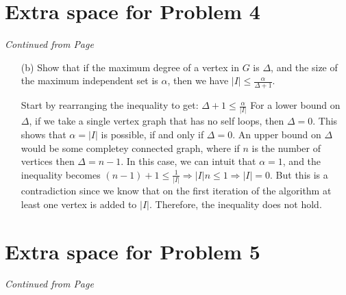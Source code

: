 \documentclass[11pt]{article}
\begin{document}
\newpage
% 
 
% 
%

\section*{Extra space for Problem 4}
\emph{Continued from Page \pageref{pg:end-of-p4}}

\label{pg:p4-continuation}

\begin{itemize}

\item[(b)]  Show that if the maximum degree of a vertex in $G$ is $\Delta$, and the
  size of the maximum independent set is $\alpha$, then we have
  $|I|\leq \frac{\alpha}{\Delta+1}$.

  Start by rearranging the inequality to get: $\Delta+1 \leq \frac{\alpha}{|I|}$
  For a lower bound on $\Delta$, if we take a single vertex graph that has no self loops, 
  then $\Delta =0$. This shows that $\alpha = |I|$ is possible, if and only if $\Delta =0$.
  An upper bound on $\Delta$ would be some completey connected graph, where if $n$
  is the number of vertices then $\Delta = n-1$. In this case, we can intuit that
  $\alpha = 1$, and the inequality becomes 
  $(n-1)+1 \leq \frac{1}{|I|} \Rightarrow |I|n \leq 1 \Rightarrow |I|=0$. But this
  is a contradiction since we know that on the first iteration of the algorithm 
  at least one vertex is added to $|I|$. Therefore, the inequality does not hold. 
 

\end{itemize}


\newpage

\section*{Extra space for Problem 5}
\emph{Continued from Page \pageref{pg:end-of-p5}}

\label{pg:p5-continuation}
\end{document}
